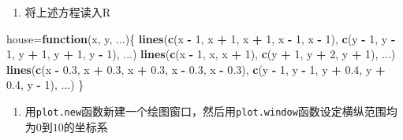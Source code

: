 \documentclass[]{article}
\newenvironment{Shaded}{\begin{snugshade}}{\end{snugshade}}
\newcommand{\ControlFlowTok}[1]{\textcolor[rgb]{0.13,0.29,0.53}{\textbf{#1}}}
\newcommand{\DecValTok}[1]{\textcolor[rgb]{0.00,0.00,0.81}{#1}}
\newcommand{\FloatTok}[1]{\textcolor[rgb]{0.00,0.00,0.81}{#1}}
\newcommand{\KeywordTok}[1]{\textcolor[rgb]{0.13,0.29,0.53}{\textbf{#1}}}
\newcommand{\NormalTok}[1]{#1}
\newcommand{\OperatorTok}[1]{\textcolor[rgb]{0.81,0.36,0.00}{\textbf{#1}}}
\newcommand{\StringTok}[1]{\textcolor[rgb]{0.31,0.60,0.02}{#1}}
\providecommand{\tightlist}{%
  \setlength{\itemsep}{0pt}\setlength{\parskip}{0pt}}
\begin{document}
\begin{enumerate}
\def\labelenumi{\alph{enumi}.}
\tightlist
\item
  将上述方程读入R
\end{enumerate}

\begin{Shaded}
\begin{Highlighting}[]
\NormalTok{house=}\ControlFlowTok{function}\NormalTok{(x, y, ...)\{}
\KeywordTok{lines}\NormalTok{(}\KeywordTok{c}\NormalTok{(x }\OperatorTok{-}\StringTok{ }\DecValTok{1}\NormalTok{, x }\OperatorTok{+}\StringTok{ }\DecValTok{1}\NormalTok{, x }\OperatorTok{+}\StringTok{ }\DecValTok{1}\NormalTok{, x }\OperatorTok{-}\StringTok{ }\DecValTok{1}\NormalTok{, x }\OperatorTok{-}\StringTok{ }\DecValTok{1}\NormalTok{),}
\KeywordTok{c}\NormalTok{(y }\OperatorTok{-}\StringTok{ }\DecValTok{1}\NormalTok{, y }\OperatorTok{-}\StringTok{ }\DecValTok{1}\NormalTok{, y }\OperatorTok{+}\StringTok{ }\DecValTok{1}\NormalTok{, y }\OperatorTok{+}\StringTok{ }\DecValTok{1}\NormalTok{, y }\OperatorTok{-}\StringTok{ }\DecValTok{1}\NormalTok{), ...)}
\KeywordTok{lines}\NormalTok{(}\KeywordTok{c}\NormalTok{(x }\OperatorTok{-}\StringTok{ }\DecValTok{1}\NormalTok{, x, x }\OperatorTok{+}\StringTok{ }\DecValTok{1}\NormalTok{), }\KeywordTok{c}\NormalTok{(y }\OperatorTok{+}\StringTok{ }\DecValTok{1}\NormalTok{, y }\OperatorTok{+}\StringTok{ }\DecValTok{2}\NormalTok{, y }\OperatorTok{+}\StringTok{ }\DecValTok{1}\NormalTok{), ...)}
\KeywordTok{lines}\NormalTok{(}\KeywordTok{c}\NormalTok{(x }\OperatorTok{-}\StringTok{ }\FloatTok{0.3}\NormalTok{, x }\OperatorTok{+}\StringTok{ }\FloatTok{0.3}\NormalTok{, x }\OperatorTok{+}\StringTok{ }\FloatTok{0.3}\NormalTok{, x }\OperatorTok{-}\StringTok{ }\FloatTok{0.3}\NormalTok{, x }\OperatorTok{-}\StringTok{ }\FloatTok{0.3}\NormalTok{),}
\KeywordTok{c}\NormalTok{(y }\OperatorTok{-}\StringTok{ }\DecValTok{1}\NormalTok{, y }\OperatorTok{-}\StringTok{ }\DecValTok{1}\NormalTok{, y }\OperatorTok{+}\StringTok{ }\FloatTok{0.4}\NormalTok{, y }\OperatorTok{+}\StringTok{ }\FloatTok{0.4}\NormalTok{, y }\OperatorTok{-}\StringTok{ }\DecValTok{1}\NormalTok{), ...)}
\NormalTok{\}}
\end{Highlighting}
\end{Shaded}

\begin{enumerate}
\def\labelenumi{\alph{enumi}.}
\setcounter{enumi}{1}
\tightlist
\item
  用\texttt{plot.new}函数新建一个绘图窗口，然后用\texttt{plot.window}函数设定横纵范围均为\(0\)到\(10\)的坐标系
\end{enumerate}
\end{document}
